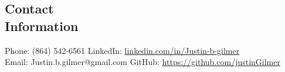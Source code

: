 \documentclass[margin,line]{resume}
\begin{document}
\begin{resume}
    \section{\mysidestyle Contact\\Information}

    Phone: (864) 542-6561           \hfill LinkedIn: \url{linkedin.com/in/Justin-b-gilmer}\\
    \noindent Email: Justin.b.gilmer@gmail.com  \hfill GitHub: \url{https://github.com/justinGilmer}\vspace{0mm}\\\vspace{-4.5mm}
    
     
    

\end{resume}
\end{document}
